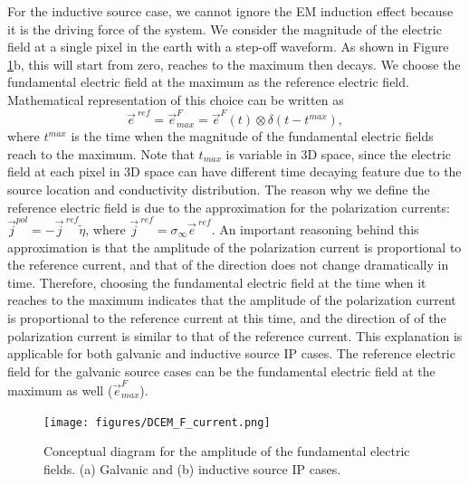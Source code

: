 \documentclass[a4paper, 11pt]{article}
\newcommand{\siginf}{\sigma_\infty}
\renewcommand {\j}  { {\vec j} }
\newcommand {\e}  { {\vec e} }
\newcommand{\peta}{\tilde{\eta}}
\begin{document}
For the inductive source case, we cannot ignore the EM induction effect because it is the driving force of the system. We consider the magnitude of the electric field at a single pixel in the earth with a step-off waveform. As shown in Figure \ref{F:DCEM_F_current}b, this will start from zero, reaches to the maximum then decays. We choose the fundamental electric field at the maximum as the reference electric field. Mathematical representation of this choice can be written as 
\begin{equation}
  \e^{\ ref} = \e^{F}_{max} = \e^{F}(t) \otimes \delta(t-t^{max}),
\end{equation}
where $t^{max}$ is the time when the magnitude of the fundamental electric fields reach to the maximum. Note that $t_{max}$ is variable in 3D space, since the electric field at each pixel in 3D space can have different time decaying feature due to the source location and conductivity distribution. The reason why we define the reference electric field is due to the approximation for the polarization currents: $\j^{pol} = -\j^{\ ref}\peta$, where $\j^{\ ref} = \siginf \e^{\ ref}$. An important reasoning behind this approximation is that the amplitude of the polarization current is proportional to the reference current, and that of the direction does not change dramatically in time. Therefore, choosing the fundamental electric field at the time when it reaches to the maximum indicates that the amplitude of the polarization current is proportional to the reference current at this time, and the direction of of the polarization current is similar to that of the reference current. This explanation is applicable for both galvanic and inductive source IP cases. The reference electric field for the galvanic source cases can be the fundamental electric field at the maximum as well ($\e^{F}_{max}$). 

\begin{figure}[htb]
  \centering  \texttt{[image: figures/DCEM\_F\_current.png]}
  \caption{Conceptual diagram for the amplitude of the fundamental electric fields. (a) Galvanic and (b) inductive source IP cases.}
  \label{F:DCEM_F_current}
\end{figure}

\clearpage
\end{document}

